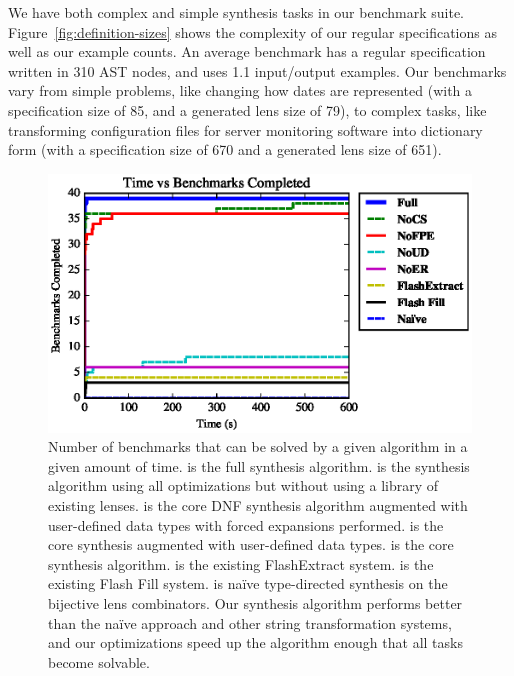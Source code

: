 \documentclass[sigplan,acmsmall]{acmart}
\begin{document}
We have both complex and simple synthesis tasks in our benchmark suite.
Figure~\ref{fig:definition-sizes} shows the complexity of our regular
specifications as well as our example counts.
An average benchmark has a regular specification written in 310 AST nodes, and
uses 1.1 input/output examples.
Our benchmarks vary from simple problems, like changing how dates are represented
(with a specification size of 85, and a generated lens size of 79), to 
complex tasks, like transforming configuration files for server monitoring
software into dictionary form (with a specification size of 670 and
a generated lens size of 651).

\begin{figure}
  \includegraphics{generated-graphs/times}
  \caption{
    Number of benchmarks that can be solved by a given algorithm in a given
    amount of time. \FullMode{} is the full synthesis
    algorithm.
    \NoCSMode{} is
    the synthesis algorithm using all optimizations but without using
    a library of
    existing lenses.  \NoFPEMode{} is the core DNF synthesis algorithm
    augmented with user-defined data types with
    forced expansions performed.  \NoERMode{} is the core synthesis
    augmented with
    user-defined data types.  \NoUDMode{} is the core synthesis algorithm.
    \FlashExtractMode{} is the existing FlashExtract system.  \FlashFillMode{} is
    the existing Flash Fill system.  \NaiveMode{} is na\"{i}ve type-directed 
    synthesis on the bijective lens combinators.  Our synthesis algorithm performs
    better than the na\"{i}ve approach and other string transformation systems,
    and our optimizations speed up the algorithm enough that all tasks become
    solvable.
  }
  \label{fig:synthesis-times}
\end{figure}
\end{document}
